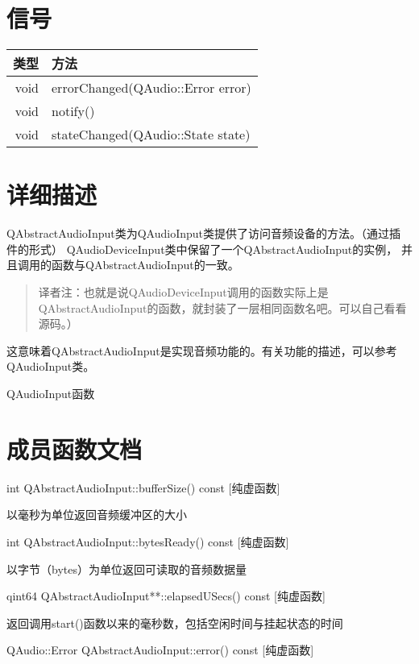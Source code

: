 \section{信号}

\begin{tabular}{|r|l|}
	\hline
	类型 & 方法 \\
	\hline
	void & errorChanged(QAudio::Error error)\\      
	\hline
	void & notify()\\
	\hline
	void & stateChanged(QAudio::State state)\\      
        \hline
\end{tabular}

\section{详细描述}

QAbstractAudioInput类为QAudioInput类提供了访问音频设备的方法。（通过插
件的形式） QAudioDeviceInput类中保留了一个QAbstractAudioInput的实例，
并且调用的函数与QAbstractAudioInput的一致。

\begin{quote}
译者注：也就是说QAudioDeviceInput调用的函数实际上是QAbstractAudioInput的函数，就封装了一层相同函数名吧。可以自己看看源码。）
\end{quote}

这意味着QAbstractAudioInput是实现音频功能的。有关功能的描述，可以参考
QAudioInput类。 

\begin{notice}[另请参阅]
QAudioInput函数
\end{notice}

\section{成员函数文档}

int QAbstractAudioInput::bufferSize() const [纯虚函数]

以毫秒为单位返回音频缓冲区的大小

int QAbstractAudioInput::bytesReady() const [纯虚函数]

以字节（bytes）为单位返回可读取的音频数据量

qint64 QAbstractAudioInput**::elapsedUSecs() const [纯虚函数]

返回调用start()函数以来的毫秒数，包括空闲时间与挂起状态的时间

QAudio::Error QAbstractAudioInput::error() const [纯虚函数]


